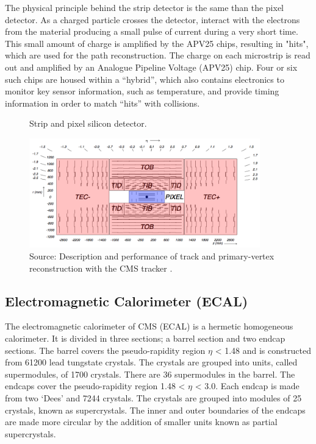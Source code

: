 The physical principle behind the strip detector is the same than the pixel detector. As a charged particle crosses the detector, interact with the electrons from the material producing a small pulse of current during a very short time. This small amount of charge is amplified by the APV25 chips, resulting in "hits", which are used for the path reconstruction. The charge on each microstrip is read out and amplified by an Analogue Pipeline Voltage (APV25) chip. Four or six such chips are housed within a “hybrid”, which also contains electronics to monitor key sensor information, such as temperature, and provide timing information in order to match “hits” with collisions. 

\begin{figure}[H]
  \caption{Strip and pixel silicon detector. \label{fig:strip}}
  \centering
\includegraphics[width=10cm]{CMS_chapter_plots/strip}
  \caption*{Source: Description and performance of track and primary-vertex
                          reconstruction with the CMS tracker \cite{Chatrchyan:2014fea}.}
\end{figure}

\subsection{Electromagnetic Calorimeter (ECAL)}

The electromagnetic calorimeter of CMS (ECAL) is a hermetic homogeneous calorimeter. It is divided in three sections; a barrel section and two endcap sections. The barrel covers the pseudo-rapidity region $\eta$ < 1.48 and is constructed from 61200 lead tungstate crystals. The crystals are grouped into units, called supermodules, of 1700 crystals. There are 36 supermodules in the barrel. The endcaps cover the pseudo-rapidity region 1.48 < $\eta$ < 3.0. Each endcap is made from two ‘Dees’ and 7244 crystals. The crystals are grouped into modules of 25 crystals, known as supercrystals. The inner and outer boundaries of the endcaps are made more circular by the addition of smaller units known as partial supercrystals.

